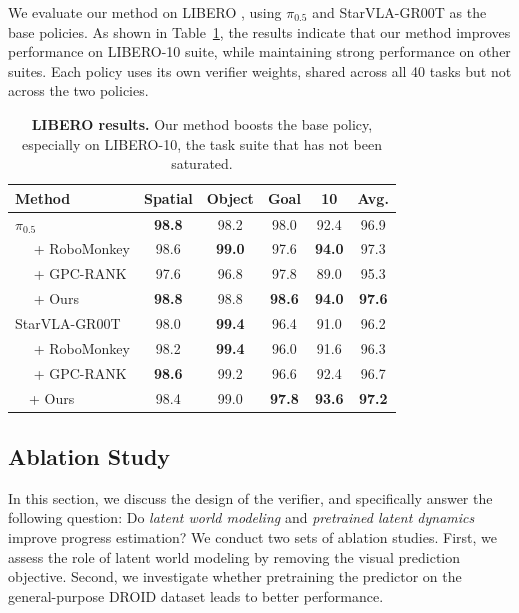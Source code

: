 \documentclass[10pt,twocolumn,letterpaper]{article}
\begin{document}
We evaluate our method on LIBERO \cite{liu2023liberobenchmarkingknowledgetransfer}, using $\pi_{0.5}$ and StarVLA-GR00T \cite{community2026starvlalegolikecodebasevisionlanguageaction} as the base policies. As shown in Table~\ref{tab:LIBERO}, the results indicate that our method improves performance on LIBERO-10 suite, while maintaining strong performance on other suites. Each policy uses its own verifier weights, shared across all 40 tasks but not across the two policies.

\begin{table}[htbp]
\small
\centering
\setlength{\tabcolsep}{3pt}
\caption{\textbf{LIBERO results.} Our method boosts the base policy, especially on LIBERO-10, the task suite that has not been saturated.}
\label{tab:LIBERO}
\begin{tabular}{lcccc c}
\toprule
Method & Spatial & Object & Goal & 10 & Avg. \\
\midrule
$\pi_{0.5}$ & \textbf{98.8} & 98.2 & 98.0 & 92.4 & 96.9\\
~~ + RoboMonkey & 98.6 & \textbf{99.0} & 97.6  & \textbf{94.0} & 97.3 \\
~~ + GPC-RANK & 97.6 & 96.8 & 97.8  & 89.0 & 95.3 \\
~~ + Ours & \textbf{98.8} & 98.8 & \textbf{98.6}  & \textbf{94.0} & \textbf{97.6} \\
\midrule
StarVLA-GR00T & 98.0 & \textbf{99.4} & 96.4 & 91.0 & 96.2 \\
~~ + RoboMonkey & 98.2 & \textbf{99.4} & 96.0  & 91.6 & 96.3 \\
~~ + GPC-RANK & \textbf{98.6} & 99.2 & 96.6  & 92.4 & 96.7 \\
~~+ Ours & 98.4 & 99.0 & \textbf{97.8} & \textbf{93.6} & \textbf{97.2}\\
\bottomrule
\end{tabular}



\end{table}




\subsection{Ablation Study}
In this section, we discuss the design of the verifier, and specifically answer the following question: Do \textit{latent world modeling} and \textit{pretrained latent dynamics} improve progress estimation?
We conduct two sets of ablation studies. First, we assess the role of latent world modeling by removing the visual prediction objective. Second, we investigate whether pretraining the predictor on the general-purpose DROID dataset \cite{khazatsky2024droid} leads to better performance.
\end{document}
